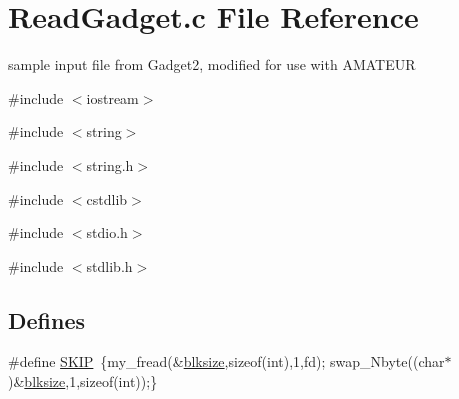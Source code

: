 \section{ReadGadget.c File Reference}
\label{ReadGadget_8c}


sample input file from Gadget2, modified for use with AMATEUR  


{\ttfamily \#include $<$iostream$>$}\par
{\ttfamily \#include $<$string$>$}\par
{\ttfamily \#include $<$string.h$>$}\par
{\ttfamily \#include $<$cstdlib$>$}\par
{\ttfamily \#include $<$stdio.h$>$}\par
{\ttfamily \#include $<$stdlib.h$>$}\par
\subsection*{Defines}
\begin{DoxyCompactItemize}
\item 
\#define \hyperlink{ReadGadget_8c_a688a4adbb87520a2b68681bd6bfb199e}{SKIP}~\{my\_\-fread(\&\hyperlink{ReadGadget_8c_a5db008489406de834c7b5598d3b90f40}{blksize},sizeof(int),1,fd); swap\_\-Nbyte((char$\ast$)\&\hyperlink{ReadGadget_8c_a5db008489406de834c7b5598d3b90f40}{blksize},1,sizeof(int));\}
\end{DoxyCompactItemize}
